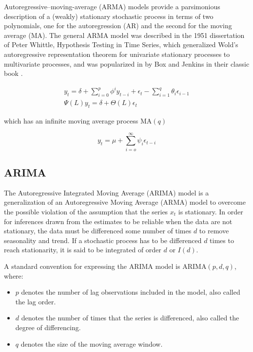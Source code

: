 \documentclass[
  11pt,
]{article}
\numberwithin{equation}{section}
\begin{document}
Autoregressive--moving-average (ARMA) models provide a parsimonious
description of a (weakly) stationary stochastic process in terms of two
polynomials, one for the autoregression (AR) and the second for the
moving average (MA). The general ARMA model was described in the 1951
dissertation of Peter Whittle, Hypothesis Testing in Time Series, which
generalized Wold's autoregressive representation theorem for univariate
stationary processes to multivariate processes, and was popularized in
by Box and Jenkins in their classic book \cite{box70}.

\begin{gather*}
y_{t} = \delta + \sum\limits_{i=0}^{p}\phi^{i}y_{t- i} + \epsilon_{t} - \sum\limits_{i=1}^{q}\theta_{i}\epsilon_{i-1} \\[8pt]
\Psi(L)y_{t} = \delta + \Theta(L)\epsilon_{t} 
\end{gather*}

which has an infinite moving average process \(\mathrm{MA}(q)\)

\[
y_{t} = \mu + \sum\limits_{i= o}^{\infty}\psi_{i}\epsilon_{t-i}
\]

\hypertarget{arima}{%
\subsection{ARIMA}\label{arima}}

The Autoregressive Integrated Moving Average (ARIMA) model is a
generalization of an Autoregressive Moving Average (ARMA) model to
overcome the possible violation of the assumption that the series
\(x_{t}\) is stationary. In order for inferences drawn from the
estimates to be reliable when the data are not stationary, the data must
be differenced some number of times \(d\) to remove seasonality and
trend. If a stochastic process has to be differenced \(d\) times to
reach stationarity, it is said to be integrated of order \(d\) or
\(I(d)\).

A standard convention for expressing the ARIMA model is
\(\mathrm{ARIMA}(p, d, q)\), where:

\begin{itemize}
\item
  \(p\) denotes the number of lag observations included in the model,
  also called the lag order.
\item
  \(d\) denotes the number of times that the series is differenced, also
  called the degree of differencing.
\item
  \(q\) denotes the size of the moving average window.
\end{itemize}
\end{document}

